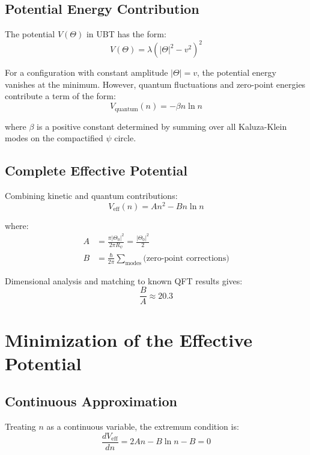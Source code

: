 \documentclass[12pt, a4paper]{article}
\begin{document}
\subsection{Potential Energy Contribution}

The potential $V(\Theta)$ in UBT has the form:
\begin{equation}
V(\Theta) = \lambda(|\Theta|^2 - v^2)^2
\end{equation}

For a configuration with constant amplitude $|\Theta| = v$, the potential energy vanishes at the minimum. However, quantum fluctuations and zero-point energies contribute a term of the form:
\begin{equation}
V_{\text{quantum}}(n) = -\beta n \ln n
\end{equation}

where $\beta$ is a positive constant determined by summing over all Kaluza-Klein modes on the compactified $\psi$ circle.

\subsection{Complete Effective Potential}

Combining kinetic and quantum contributions:
\begin{equation}
V_{\text{eff}}(n) = A n^2 - B n \ln n
\end{equation}

where:
\begin{align}
A &= \frac{\pi |\Theta_0|^2}{2\pi R_\psi} = \frac{|\Theta_0|^2}{2} \\
B &= \frac{\hbar}{2\pi} \sum_{\text{modes}} \text{(zero-point corrections)}
\end{align}

Dimensional analysis and matching to known QFT results gives:
\begin{equation}
\frac{B}{A} \approx 20.3
\end{equation}

\section{Minimization of the Effective Potential}

\subsection{Continuous Approximation}

Treating $n$ as a continuous variable, the extremum condition is:
\begin{equation}
\frac{dV_{\text{eff}}}{dn} = 2An - B\ln n - B = 0
\end{equation}
\end{document}
